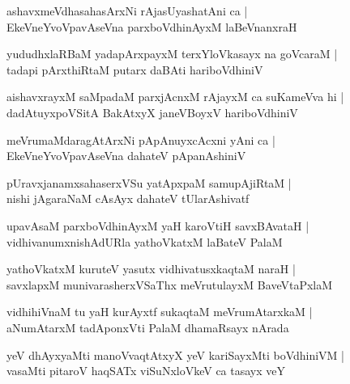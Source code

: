 \documentclass[twoside,12pt,openright]{book}
\newcounter{shloka}[chapter]
\begin{document}
\begin{shloka}%
ashavxmeVdhasahasArxNi rAjasUyashatAni ca |\\
EkeVneYvoVpavAseVna parxboVdhinAyxM laBeVnanxraH
\end{shloka}

\begin{shloka}%
yududhxlaRBaM yadapArxpayxM terxYloVkasayx na goVcaraM |\\
tadapi pArxthiRtaM putarx daBAti hariboVdhiniV 
\end{shloka}

\begin{shloka}%
aishavxrayxM saMpadaM parxjAcnxM rAjayxM ca suKameVva hi |\\
dadAtuyxpoVSitA BakAtxyX janeVBoyxV hariboVdhiniV 
\end{shloka}

\begin{shloka}%
meVrumaMdaragAtArxNi pApAnuyxcAcxni yAni ca |\\
EkeVneYvoVpavAseVna dahateV pApanAshiniV 
\end{shloka}

\begin{shloka}%
pUravxjanamxsahaserxVSu yatApxpaM samupAjiRtaM |\\
nishi jAgaraNaM cAsAyx dahateV tUlarAshivatf
\end{shloka}

\begin{shloka}%
upavAsaM parxboVdhinAyxM yaH karoVtiH savxBAvataH |\\
vidhivanumxnishAdURla yathoVkatxM laBateV PalaM
\end{shloka}

\begin{shloka}%
yathoVkatxM kuruteV yasutx vidhivatusxkaqtaM naraH |\\
savxlapxM munivarasherxVSaThx meVrutulayxM BaveVtaPxlaM 
\end{shloka}

\begin{shloka}%
vidhihiVnaM tu yaH kurAyxtf sukaqtaM meVrumAtarxkaM |\\
aNumAtarxM tadAponxVti PalaM dhamaRsayx nArada
\end{shloka}

\begin{shloka}%
yeV dhAyxyaMti manoVvaqtAtxyX yeV kariSayxMti boVdhiniVM |\\
vasaMti pitaroV haqSATx viSuNxloVkeV ca tasayx veY
\end{shloka}
\end{document}

